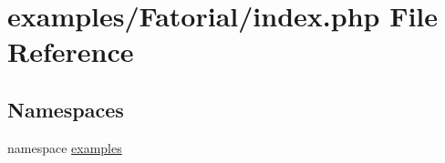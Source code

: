 \hypertarget{examples_2_fatorial_2index_8php}{
\section{examples/Fatorial/index.php File Reference}
\label{examples_2_fatorial_2index_8php}
}
\subsection*{Namespaces}
\begin{CompactItemize}
\item 
namespace \hyperlink{namespaceexamples}{examples}
\end{CompactItemize}
